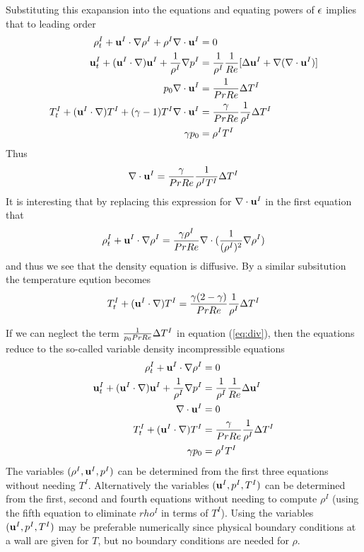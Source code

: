 \documentclass{article}
\begin{document}
Substituting this exapansion into the equations and equating powers of $\epsilon$
implies that to leading order
\begin{align}
    \rho^I_t + {\bf u}^I\cdot\nabla\rho^I  +\rho^I \nabla\cdot{\bf u}^I &= 0 \\
   {\bf u}^I_t + ({\bf u}^I\cdot\nabla){\bf u}^I + {1\over\rho^I}\nabla p^I &= {1\over\rho^I} {1\over Re}[\Delta {\bf u}^I + \nabla(\nabla\cdot{\bf u}^I) ] \\
   p_0 \nabla\cdot{\bf u}^I &=  {1 \over Pr Re} \Delta T^I  \label{eq:div} \\
   T^I_t + ({\bf u}^I\cdot\nabla) T^I +(\gamma-1) T^I \nabla\cdot{\bf u}^I
       &= {\gamma \over Pr Re} { 1 \over \rho^I } \Delta T^I \\
   \gamma p_0 &= \rho^I T^I
\end{align}
Thus
\[
\nabla\cdot{\bf u}^I = {\gamma \over Pr Re} { 1 \over \rho^I T^I } \Delta T^I
\]
It is interesting that by replacing this expression for $\nabla\cdot{\bf u}^I$ in the first equation 
that
\[
    \rho^I_t + {\bf u}^I\cdot\nabla\rho^I  =  {\gamma \rho^I \over Pr Re} \nabla\cdot( {1\over (\rho^I)^2} \nabla \rho^I )
\]
and thus we see that the density equation is diffusive. By a similar subsitution the temperature eqution becomes
\[
   T^I_t + ({\bf u}^I\cdot\nabla) T^I 
       = {\gamma(2-\gamma) \over Pr Re} { 1 \over \rho^I } \Delta T^I
\]

If we can neglect the term ${1 \over p_0 Pr Re} \Delta T^I$ in equation (\ref{eq:div}), 
then the equations reduce to the
so-called variable density incompressible equations
\begin{align*}
    \rho^I_t + {\bf u}^I\cdot\nabla\rho^I  &= 0 \\
   {\bf u}^I_t + ({\bf u}^I\cdot\nabla){\bf u}^I + {1\over\rho^I}\nabla p^I &= {1\over\rho^I} {1\over Re} \Delta {\bf u}^I  \\
   \nabla\cdot{\bf u}^I &=  0  \\
   T^I_t + ({\bf u}^I\cdot\nabla) T^I  &= {\gamma \over Pr Re} { 1 \over \rho^I } \Delta T^I \\
   \gamma p_0 &= \rho^I T^I
\end{align*}
The variables $(\rho^I,{\bf u}^I,p^I)$ can be determined from the first three equations without needing $T^I$.
Alternatively the variables $({\bf u}^I,p^I,T^I)$ can be determined from the first, second and fourth
equations without needing to compute $\rho^I$ (using the fifth equation to eliminate $rho^I$ in terms
of $T^I$). Using the variables $({\bf u}^I,p^I,T^I)$ may be preferable numerically since physical boundary
conditions at a wall are given for $T$, but no boundary conditions are needed for $\rho$.
\end{document}
